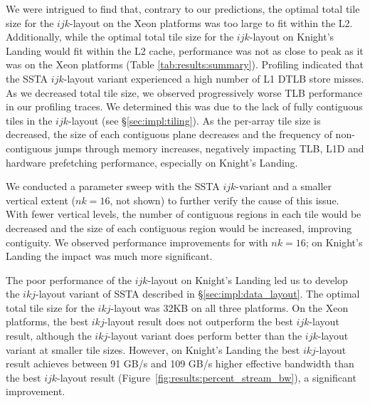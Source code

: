 \documentclass{sig-alternate}
\begin{document}
We were intrigued to find that, contrary to our predictions, the optimal total
  tile size for the \(ijk\)-layout on the Xeon platforms was too large to fit
  within the L2.
Additionally, while the optimal total tile size for the \(ijk\)-layout on
  Knight's Landing would fit within the L2 cache, performance was not as close to
  peak as it was on the Xeon platforms (Table \ref{tab:results:summary}).
Profiling indicated that the SSTA \(ijk\)-layout variant experienced a high
  number of L1 DTLB store misses.
As we decreased total tile size, we observed progressively worse TLB performance
  in our profiling traces.
We determined this was due to the lack of fully contiguous tiles in the
  \(ijk\)-layout (see \S\ref{sec:impl:tiling}). 
As the per-array tile size is decreased, the size of each contiguous
  plane decreases and the frequency of non-contiguous jumps through memory
  increases, negatively impacting TLB, L1D and hardware prefetching performance,
  especially on Knight's Landing.

We conducted a parameter sweep with the SSTA \(ijk\)-variant and a smaller
  vertical extent (\(nk = 16\), not shown) to further verify the cause of this
  issue.
With fewer vertical levels, the number of contiguous regions in each tile would
  be decreased and the size of each contiguous region would be increased,
  improving contiguity.
We observed performance improvements for with \(nk = 16\); on Knight's Landing
  the impact was much more significant.

The poor performance of the \(ijk\)-layout on Knight's Landing led us to
  develop the \(ikj\)-layout variant of SSTA described in
  \S\ref{sec:impl:data_layout}.
The optimal total tile size for the \(ikj\)-layout was 32KB on all three
  platforms.
On the Xeon platforms, the best \(ikj\)-layout result does not outperform the
  best \(ijk\)-layout result, although the \(ikj\)-layout variant does perform
  better than the \(ijk\)-layout variant at smaller tile sizes.
However, on Knight's Landing the best \(ikj\)-layout result achieves
  between 91 GB/s and 109 GB/s higher effective bandwidth than the best
  \(ijk\)-layout result (Figure~\ref{fig:results:percent_stream_bw}), a significant
  improvement.
\end{document}
